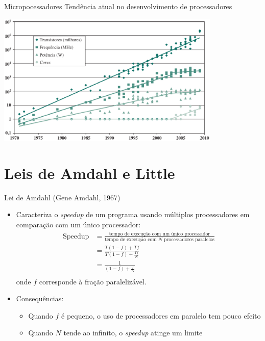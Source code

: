 \begin{slide}[toc=]{Micropocessadores}
	Tendência atual no desenvolvimento de processadores
	\begin{center}
		\includegraphics[width = 0.8\textwidth]{figs/tendencia}
	\end{center}
\end{slide}

\section[slide=true]{Leis de Amdahl e Little}
\begin{slide}{Lei de Amdahl (Gene Amdahl, 1967)}
\begin{itemize}
   \item Caracteriza o \textit{speedup} de um programa usando múltiplos processadores em comparação com um único processador:
   \begin{align*}
      \text{Speedup} &= \frac{\text{tempo de execução com um único processador}}{\text{tempo de execução com $N$ processadores paralelos}}\\
              &= \frac{T(1-f)+Tf}{T(1-f)+\frac{Tf}{N}}\\
              &= \frac{1}{(1-f)+\frac{f}{N}}\\
   \end{align*}
   onde $f$ corresponde à fração paralelizável.\pause
		\item Consequências:
			\begin{itemize}
				\item Quando $f$ é pequeno, o uso de processadores em paralelo tem pouco efeito
				\item Quando $N$ tende ao infinito, o \emph{speedup} atinge um limite
			\end{itemize}
\end{itemize}
\end{slide}

